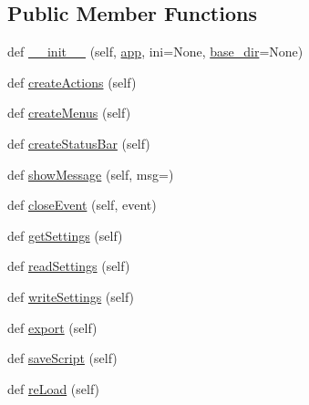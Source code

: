 \subsection*{Public Member Functions}
\begin{DoxyCompactItemize}
\item 
def \mbox{\hyperlink{classgetdist_1_1gui_1_1mainwindow_1_1MainWindow_ab182efaf585a11dbcf55b28e00010e98}{\+\_\+\+\_\+init\+\_\+\+\_\+}} (self, \mbox{\hyperlink{classgetdist_1_1gui_1_1mainwindow_1_1MainWindow_a4d3a1d8d893ed8672986474f79ec7ed3}{app}}, ini=None, \mbox{\hyperlink{classgetdist_1_1gui_1_1mainwindow_1_1MainWindow_a6ebfb6aab05c9138ae69b241cdb33e34}{base\+\_\+dir}}=None)
\item 
def \mbox{\hyperlink{classgetdist_1_1gui_1_1mainwindow_1_1MainWindow_aa9bbbc91470ed6644800cb8703ebae4c}{create\+Actions}} (self)
\item 
def \mbox{\hyperlink{classgetdist_1_1gui_1_1mainwindow_1_1MainWindow_a2f092ff4d1686da3ddd00dc455746ca6}{create\+Menus}} (self)
\item 
def \mbox{\hyperlink{classgetdist_1_1gui_1_1mainwindow_1_1MainWindow_a4949f535773d57d42fce84ee2755afc8}{create\+Status\+Bar}} (self)
\item 
def \mbox{\hyperlink{classgetdist_1_1gui_1_1mainwindow_1_1MainWindow_a8d131b0b8b9945bd609acb00f21eb74f}{show\+Message}} (self, msg=\textquotesingle{}\textquotesingle{})
\item 
def \mbox{\hyperlink{classgetdist_1_1gui_1_1mainwindow_1_1MainWindow_aeb3af901563e3a12835412c7c44e9e7c}{close\+Event}} (self, event)
\item 
def \mbox{\hyperlink{classgetdist_1_1gui_1_1mainwindow_1_1MainWindow_a3b46ccf380b69cea6f4f95ba9ec4ed4d}{get\+Settings}} (self)
\item 
def \mbox{\hyperlink{classgetdist_1_1gui_1_1mainwindow_1_1MainWindow_a7e29a3ab6b2531c8680823bd4ae26c1d}{read\+Settings}} (self)
\item 
def \mbox{\hyperlink{classgetdist_1_1gui_1_1mainwindow_1_1MainWindow_ac5712470b76dd04c734584cbc7da1111}{write\+Settings}} (self)
\item 
def \mbox{\hyperlink{classgetdist_1_1gui_1_1mainwindow_1_1MainWindow_aceee119bf0260d396991cbdbb396538a}{export}} (self)
\item 
def \mbox{\hyperlink{classgetdist_1_1gui_1_1mainwindow_1_1MainWindow_a6a523a1ab4ce1b0cb299e7b0f44f9651}{save\+Script}} (self)
\item 
def \mbox{\hyperlink{classgetdist_1_1gui_1_1mainwindow_1_1MainWindow_ad64925d8336c287f82ae6e2f16d9de71}{re\+Load}} (self)

\end{DoxyCompactItemize}
